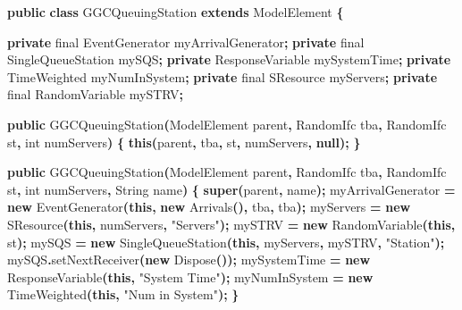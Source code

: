 \documentclass[
]{book}
\newenvironment{Shaded}{\begin{snugshade}}{\end{snugshade}}
\newcommand{\BuiltInTok}[1]{#1}
\newcommand{\DataTypeTok}[1]{\textcolor[rgb]{0.13,0.29,0.53}{#1}}
\newcommand{\FunctionTok}[1]{\textcolor[rgb]{0.00,0.00,0.00}{#1}}
\newcommand{\KeywordTok}[1]{\textcolor[rgb]{0.13,0.29,0.53}{\textbf{#1}}}
\newcommand{\NormalTok}[1]{#1}
\newcommand{\OperatorTok}[1]{\textcolor[rgb]{0.81,0.36,0.00}{\textbf{#1}}}
\newcommand{\StringTok}[1]{\textcolor[rgb]{0.31,0.60,0.02}{#1}}
\theoremstyle{definition}
\theoremstyle{definition}
\theoremstyle{definition}
\theoremstyle{definition}
\theoremstyle{remark}
\begin{document}
\begin{Shaded}
\begin{Highlighting}[]
\KeywordTok{public} \KeywordTok{class}\NormalTok{ GGCQueuingStation }\KeywordTok{extends}\NormalTok{ ModelElement }\OperatorTok{\{}

    \KeywordTok{private} \DataTypeTok{final}\NormalTok{ EventGenerator myArrivalGenerator}\OperatorTok{;}
    \KeywordTok{private} \DataTypeTok{final}\NormalTok{ SingleQueueStation mySQS}\OperatorTok{;}
    \KeywordTok{private}\NormalTok{ ResponseVariable mySystemTime}\OperatorTok{;}
    \KeywordTok{private}\NormalTok{ TimeWeighted myNumInSystem}\OperatorTok{;}
    \KeywordTok{private} \DataTypeTok{final}\NormalTok{ SResource myServers}\OperatorTok{;}
    \KeywordTok{private} \DataTypeTok{final}\NormalTok{ RandomVariable mySTRV}\OperatorTok{;}

    \KeywordTok{public} \FunctionTok{GGCQueuingStation}\OperatorTok{(}\NormalTok{ModelElement parent}\OperatorTok{,}\NormalTok{ RandomIfc tba}\OperatorTok{,}\NormalTok{ RandomIfc st}\OperatorTok{,}
            \DataTypeTok{int}\NormalTok{ numServers}\OperatorTok{)} \OperatorTok{\{}
        \KeywordTok{this}\OperatorTok{(}\NormalTok{parent}\OperatorTok{,}\NormalTok{ tba}\OperatorTok{,}\NormalTok{ st}\OperatorTok{,}\NormalTok{ numServers}\OperatorTok{,} \KeywordTok{null}\OperatorTok{);}
    \OperatorTok{\}}

    \KeywordTok{public} \FunctionTok{GGCQueuingStation}\OperatorTok{(}\NormalTok{ModelElement parent}\OperatorTok{,}\NormalTok{ RandomIfc tba}\OperatorTok{,}\NormalTok{ RandomIfc st}\OperatorTok{,}
                             \DataTypeTok{int}\NormalTok{ numServers}\OperatorTok{,} \BuiltInTok{String}\NormalTok{ name}\OperatorTok{)} \OperatorTok{\{}
        \KeywordTok{super}\OperatorTok{(}\NormalTok{parent}\OperatorTok{,}\NormalTok{ name}\OperatorTok{);}
\NormalTok{        myArrivalGenerator }\OperatorTok{=} \KeywordTok{new} \FunctionTok{EventGenerator}\OperatorTok{(}\KeywordTok{this}\OperatorTok{,} \KeywordTok{new} \FunctionTok{Arrivals}\OperatorTok{(),}\NormalTok{ tba}\OperatorTok{,}\NormalTok{ tba}\OperatorTok{);}
\NormalTok{        myServers }\OperatorTok{=} \KeywordTok{new} \FunctionTok{SResource}\OperatorTok{(}\KeywordTok{this}\OperatorTok{,}\NormalTok{ numServers}\OperatorTok{,} \StringTok{"Servers"}\OperatorTok{);}
\NormalTok{        mySTRV }\OperatorTok{=} \KeywordTok{new} \FunctionTok{RandomVariable}\OperatorTok{(}\KeywordTok{this}\OperatorTok{,}\NormalTok{ st}\OperatorTok{);}
\NormalTok{        mySQS }\OperatorTok{=} \KeywordTok{new} \FunctionTok{SingleQueueStation}\OperatorTok{(}\KeywordTok{this}\OperatorTok{,}\NormalTok{ myServers}\OperatorTok{,}\NormalTok{ mySTRV}\OperatorTok{,} \StringTok{"Station"}\OperatorTok{);}
\NormalTok{        mySQS}\OperatorTok{.}\FunctionTok{setNextReceiver}\OperatorTok{(}\KeywordTok{new} \FunctionTok{Dispose}\OperatorTok{());}
\NormalTok{        mySystemTime }\OperatorTok{=} \KeywordTok{new} \FunctionTok{ResponseVariable}\OperatorTok{(}\KeywordTok{this}\OperatorTok{,} \StringTok{"System Time"}\OperatorTok{);}
\NormalTok{        myNumInSystem }\OperatorTok{=} \KeywordTok{new} \FunctionTok{TimeWeighted}\OperatorTok{(}\KeywordTok{this}\OperatorTok{,} \StringTok{"Num in System"}\OperatorTok{);}
    \OperatorTok{\}}


\end{Highlighting}
\end{Shaded}
\end{document}
